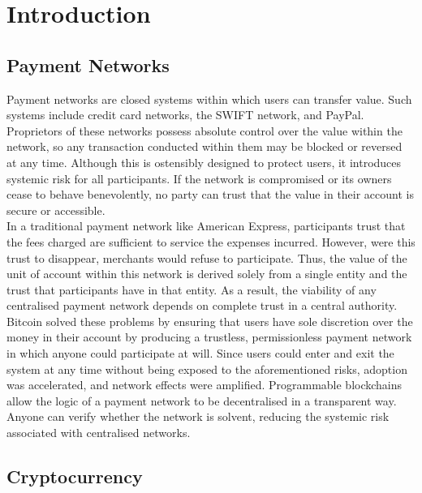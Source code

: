 \section{Introduction}

\subsection{Payment Networks}

\noindent Payment networks are closed systems within which users can transfer
value. Such systems include credit card networks, the SWIFT network, and
PayPal. Proprietors of these networks possess absolute control over the value
within the network, so any transaction conducted within them may be blocked
or reversed at any time. Although this is ostensibly designed to protect
users, it introduces systemic risk for all participants. If the network is
compromised or its owners cease to behave benevolently, no party can trust
that the value in their account is secure or accessible. \\

\noindent In a traditional payment network like American Express,
participants trust that the fees charged are sufficient to service the
expenses incurred. However, were this trust to disappear, merchants would
refuse to participate. Thus, the value of the unit of account within this
network is derived solely from a single entity and the trust that
participants have in that entity. As a result, the viability of any
centralised payment network depends on complete trust in a central authority.
\\

\noindent Bitcoin solved these problems by ensuring that users have sole
discretion over the money in their account by producing a trustless,
permissionless payment network in which anyone could participate at will.
Since users could enter and exit the system at any time without being exposed
to the aforementioned risks, adoption was accelerated, and network effects
were amplified. Programmable blockchains allow the logic of a payment network
to be decentralised in a transparent way. Anyone can verify whether the
network is solvent, reducing the systemic risk associated with centralised
networks.

\subsection{Cryptocurrency}

